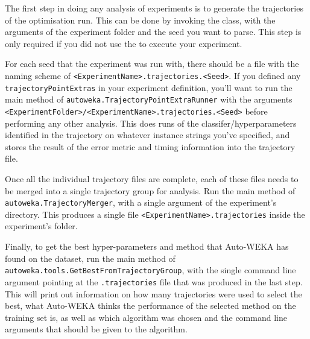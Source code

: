The first step in doing any analysis of experiments is to generate the trajectories of the optimisation run. This can be done by invoking the  class, with the arguments of the experiment folder and the seed you want to parse. This step is only required if you did not use the  to execute your experiment.

For each seed that the experiment was run with, there should be a file with the naming scheme of \texttt{<ExperimentName>.trajectories.<Seed>}. If you defined any \texttt{trajectoryPointExtras} in your experiment definition, you'll want to run the main method of \texttt{autoweka.TrajectoryPointExtraRunner} with the arguments \\\texttt{<ExperimentFolder>/<ExperimentName>.trajectories.<Seed>} before performing any other analysis. This does runs of the classifer/hyperparameters identified in the trajectory on whatever instance strings you've specified, and stores the result of the error metric and timing information into the trajectory file.

Once all the individual trajectory files are complete, each of these files needs to be merged into a single trajectory group for analysis. Run the main method of \texttt{autoweka.TrajectoryMerger}, with a single argument of the experiment's directory. This produces a single file \texttt{<ExperimentName>.trajectories} inside the experiment's folder.

Finally, to get the best hyper-parameters and method that Auto-WEKA has found on the dataset, run the main method of \texttt{autoweka.tools.GetBestFromTrajectoryGroup}, with the single command line argument pointing at the \texttt{.trajectories} file that was produced in the last step. This will print out information on how many trajectories were used to select the best, what Auto-WEKA thinks the performance of the selected method on the training set is, as well as which algorithm was chosen and the command line arguments that should be given to the algorithm.